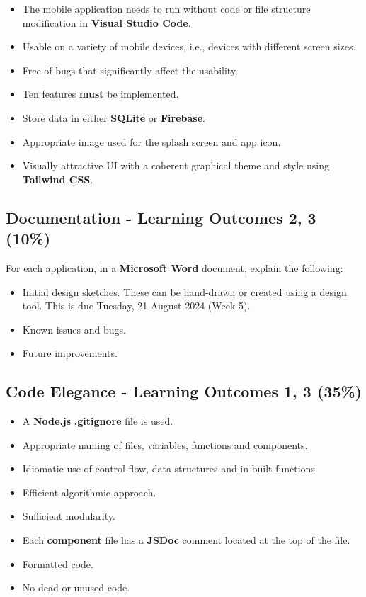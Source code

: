 \documentclass{article}
\begin{document}
\begin{itemize}
  \begin{itemize}
    \item The mobile application needs to run without code or file structure modification in \textbf{Visual Studio Code}.
    \item Usable on a variety of mobile devices, i.e., devices with different screen sizes.
    \item Free of bugs that significantly affect the usability.
    \item Ten features \textbf{must} be implemented.
    \item Store data in either \textbf{SQLite} or \textbf{Firebase}. 
    \item Appropriate image used for the splash screen and app icon.
    \item Visually attractive UI with a coherent graphical theme and style using \textbf{Tailwind CSS}.
  \end{itemize}
\end{itemize}

\subsection*{Documentation - Learning Outcomes 2, 3 (10\%)}
For each application, in a \textbf{Microsoft Word} document, explain the following:
\begin{itemize}
  \item Initial design sketches. These can be hand-drawn or created using a design tool. This is due Tuesday, 21 August 2024 (Week 5).
  \item Known issues and bugs.
  \item Future improvements.
\end{itemize}

\subsection*{Code Elegance - Learning Outcomes 1, 3 (35\%)}
\begin{itemize}
  \item A \textbf{Node.js} \textbf{.gitignore} file is used.
  \item Appropriate naming of files, variables, functions and components.
  \item Idiomatic use of control flow, data structures and in-built functions.
  \item Efficient algorithmic approach.
  \item Sufficient modularity.
  \item Each \textbf{component} file has a \textbf{JSDoc} comment located at the top of the file.
  \item Formatted code.
  \item No dead or unused code. 
\end{itemize}
\end{document}
